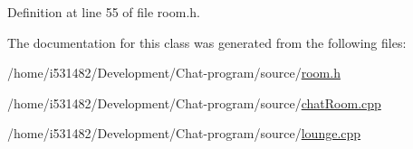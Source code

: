 Definition at line 55 of file room.\+h.



The documentation for this class was generated from the following files\+:\begin{DoxyCompactItemize}
\item 
/home/i531482/\+Development/\+Chat-\/program/source/\hyperlink{room_8h}{room.\+h}\item 
/home/i531482/\+Development/\+Chat-\/program/source/\hyperlink{chat_room_8cpp}{chat\+Room.\+cpp}\item 
/home/i531482/\+Development/\+Chat-\/program/source/\hyperlink{lounge_8cpp}{lounge.\+cpp}\end{DoxyCompactItemize}
